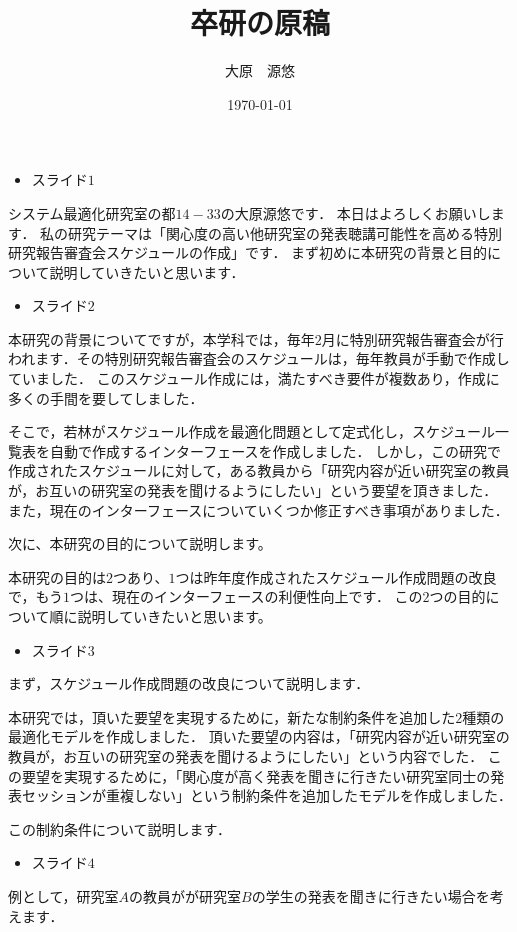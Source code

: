 \documentclass[a4j]{jarticle}
\title{\huge 卒研の原稿}
\author{大原　源悠}
\date{\today}
\begin{document}
%
\maketitle
%

\begin{itemize}
\item スライド$1$
\end{itemize}
システム最適化研究室の都$14-33$の大原源悠です．
本日はよろしくお願いします．
私の研究テーマは「関心度の高い他研究室の発表聴講可能性を高める特別研究報告審査会スケジュールの作成」です．
まず初めに本研究の背景と目的について説明していきたいと思います．
%

\begin{itemize}
\item スライド$2$
\end{itemize}
本研究の背景についてですが，本学科では，毎年$2$月に特別研究報告審査会が行われます．その特別研究報告審査会のスケジュールは，毎年教員が手動で作成していました．
このスケジュール作成には，満たすべき要件が複数あり，作成に多くの手間を要してしました．

そこで，若林がスケジュール作成を最適化問題として定式化し，スケジュール一覧表を自動で作成するインターフェースを作成しました．
しかし，この研究で作成されたスケジュールに対して，ある教員から「研究内容が近い研究室の教員が，お互いの研究室の発表を聞けるようにしたい」という要望を頂きました．
また，現在のインターフェースについていくつか修正すべき事項がありました．

次に、本研究の目的について説明します。

本研究の目的は$2$つあり、$1$つは昨年度作成されたスケジュール作成問題の改良で，もう$1$つは、現在のインターフェースの利便性向上です．
この$2$つの目的について順に説明していきたいと思います。
%

\begin{itemize}
\item スライド$3$
\end{itemize}
まず，スケジュール作成問題の改良について説明します．

本研究では，頂いた要望を実現するために，新たな制約条件を追加した$2$種類の最適化モデルを作成しました．
頂いた要望の内容は，「研究内容が近い研究室の教員が，お互いの研究室の発表を聞けるようにしたい」という内容でした．
この要望を実現するために，「関心度が高く発表を聞きに行きたい研究室同士の発表セッションが重複しない」という制約条件を追加したモデルを作成しました．

この制約条件について説明します．


\begin{itemize}
\item スライド$4$
\end{itemize}
例として，研究室$A$の教員がが研究室$B$の学生の発表を聞きに行きたい場合を考えます．
\end{document}
